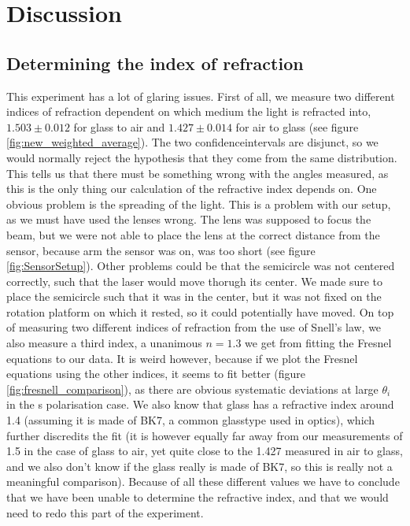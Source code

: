 \chapter{Discussion}
\section{Determining the index of refraction}
This experiment has a lot of glaring issues. First of all, we measure two different indices of refraction dependent on which medium the light is refracted into, $1.503\pm0.012$ for glass to air and $1.427\pm 0.014$ for air to glass (see figure \ref{fig:new_weighted_average}). The two confidenceintervals are disjunct, so we would normally reject the hypothesis that they come from the same distribution.
This tells us that there must be something wrong with the angles measured, as this is the only thing our calculation of the refractive index depends on. 
One obvious problem is the spreading of the light. 
This is a problem with our setup, as we must have used the lenses wrong. 
The lens was supposed to focus the beam, but we were not able to place the lens at the correct distance from the sensor, 
because arm the sensor was on, was too short (see figure \ref{fig:SensorSetup}).
Other problems could be that the semicircle was not centered correctly, 
such that the laser would move thorugh its center. 
We made sure to place the semicircle such that it was in the center, 
but it was not fixed on the rotation platform on which it rested, 
so it could potentially have moved.
On top of measuring two different indices of refraction from the use of Snell's law, we also measure a third index, 
a unanimous $n = 1.3$ we get from fitting the Fresnel equations to our data. It is weird however, because if we plot the Fresnel equations using the other indices, 
it seems to fit better (figure \ref{fig:fresnell_comparison}), as there are obvious systematic deviations at large $\theta_i$ in the s polarisation case. 
We also know that glass has a refractive index around 1.4\autocite{polyanskiy_refractiveindex} (assuming it is made of BK7, a common glasstype used in optics), which further discredits the fit (it is however equally far away from our measurements of 1.5 in the case of glass to air, yet quite close to the 1.427 measured in air to glass, and we also don't know if the glass really is made of BK7, so this is really not a meaningful comparison).
Because of all these different values we have to conclude that we have been unable to determine the refractive index,
and that we would need to redo this part of the experiment.

